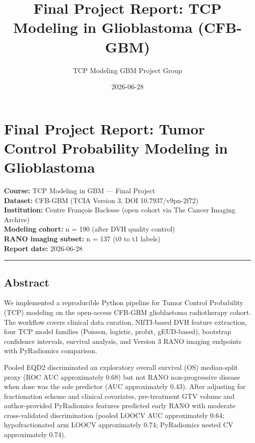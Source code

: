 \documentclass[
  11pt,
]{article}
\title{Final Project Report: TCP Modeling in Glioblastoma (CFB-GBM)}
\author{TCP Modeling GBM Project Group}
\date{2026-06-28}
\begin{document}
\maketitle

{
\setcounter{tocdepth}{3}
\tableofcontents
}
\section{Final Project Report: Tumor Control Probability Modeling in
Glioblastoma}\label{final-project-report-tumor-control-probability-modeling-in-glioblastoma}

\textbf{Course:} TCP Modeling in GBM --- Final Project\\
\textbf{Dataset:} CFB-GBM (TCIA Version 3, DOI 10.7937/v9pn-2f72)\\
\textbf{Institution:} Centre François Baclesse (open cohort via The
Cancer Imaging Archive)\\
\textbf{Modeling cohort:} n = 190 (after DVH quality control)\\
\textbf{RANO imaging subset:} n = 137 (t0 to t1 labels)\\
\textbf{Report date:} 2026-06-28

\begin{center}\rule{0.5\linewidth}{0.5pt}\end{center}

\subsection{Abstract}\label{abstract}

We implemented a reproducible Python pipeline for Tumor Control
Probability (TCP) modeling on the open-access CFB-GBM glioblastoma
radiotherapy cohort. The workflow covers clinical data curation,
NIfTI-based DVH feature extraction, four TCP model families (Poisson,
logistic, probit, gEUD-based), bootstrap confidence intervals, survival
analysis, and Version 3 RANO imaging endpoints with PyRadiomics
comparison.

Pooled EQD2 discriminated an exploratory overall survival (OS)
median-split proxy (ROC AUC approximately 0.68) but not RANO
non-progressive disease when dose was the sole predictor (AUC
approximately 0.43). After adjusting for fractionation scheme and
clinical covariates, pre-treatment GTV volume and author-provided
PyRadiomics features predicted early RANO with moderate cross-validated
discrimination (pooled LOOCV AUC approximately 0.64; hypofractionated
arm LOOCV approximately 0.74; PyRadiomics nested CV approximately 0.74).
\end{document}

